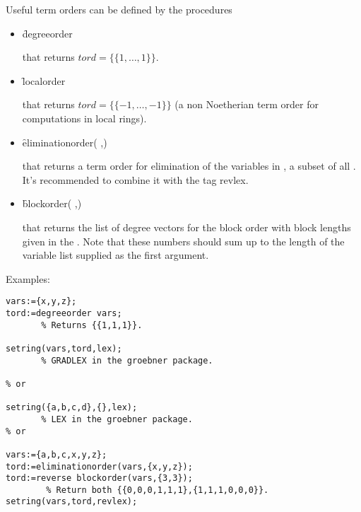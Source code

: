 Useful term orders can be defined by the procedures
\begin{itemize}
\item []
\begin{syntax}
  \f{degreeorder} 
\end{syntax}
that returns $tord=\{\{1,\ldots ,1\}\}$.

\item []
\begin{syntax}
  \f{localorder} 
\end{syntax}
that returns $tord=\{\{-1,\ldots ,-1\}\}$ (a non Noetherian term
order for computations in local rings).

\item[]
\begin{syntax}
 \f{eliminationorder}( ,)
\end{syntax}
that returns a term order for elimination of the variables in
, a subset of all . It's recommended to
combine it with the tag revlex.

\item[]
\begin{syntax}
 \f{blockorder}( ,)
\end{syntax}
that returns the list of degree vectors for the block order with
block lengths given in the . Note that these numbers
should sum up to the length of the variable list supplied as the first
argument.
\end{itemize}

\noindent Examples:
\begin{verbatim}
vars:={x,y,z};
tord:=degreeorder vars;
       % Returns {{1,1,1}}.

setring(vars,tord,lex);
       % GRADLEX in the groebner package.

% or

setring({a,b,c,d},{},lex);
       % LEX in the groebner package.
% or

vars:={a,b,c,x,y,z};
tord:=eliminationorder(vars,{x,y,z});
tord:=reverse blockorder(vars,{3,3});
        % Return both {{0,0,0,1,1,1},{1,1,1,0,0,0}}.
setring(vars,tord,revlex);
\end{verbatim}

